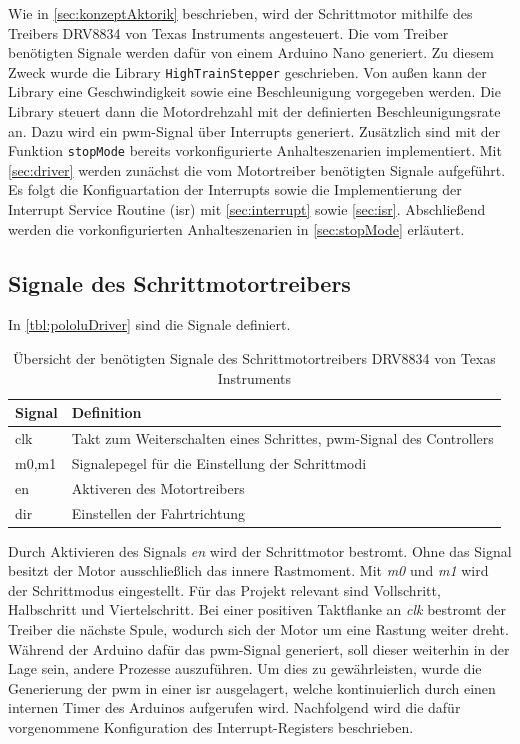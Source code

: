 Wie in \autoref{sec:konzeptAktorik} beschrieben, wird der Schrittmotor mithilfe des Treibers DRV8834 von Texas Instruments angesteuert. Die vom Treiber benötigten Signale werden dafür von einem Arduino Nano generiert. Zu diesem Zweck wurde die Library \texttt{HighTrainStepper} geschrieben. Von außen kann der Library  eine Geschwindigkeit sowie eine Beschleunigung vorgegeben werden. Die Library steuert dann die Motordrehzahl mit der definierten Beschleunigungsrate an. Dazu wird ein \acrshort{pwm}-Signal über Interrupts generiert. Zusätzlich sind mit der Funktion \texttt{stopMode} bereits vorkonfigurierte Anhalteszenarien implementiert. Mit \autoref{sec:driver} werden zunächst die vom Motortreiber benötigten Signale aufgeführt. Es folgt die Konfiguartation der Interrupts sowie die Implementierung der Interrupt Service Routine (\acrshort{isr}) mit \autoref{sec:interrupt} sowie \autoref{sec:isr}. Abschließend  werden die vorkonfigurierten Anhalteszenarien in \autoref{sec:stopMode} erläutert.


\subsection{Signale des Schrittmotortreibers}
\label{sec:driver}

In \autoref{tbl:pololuDriver} sind die Signale definiert. 

\begin{table}[h]
	\begin{center}
		\begin{tabular}[h]{l|l}
			\textbf{Signal} & \textbf{Definition} \\
			\hline
			clk & Takt zum Weiterschalten eines Schrittes, \acrshort{pwm}-Signal des Controllers\\
			\hline
			m0,m1 & Signalepegel für die Einstellung der Schrittmodi\\
			\hline
			en & Aktiveren des Motortreibers\\
			\hline
			dir & Einstellen der Fahrtrichtung\\
		\end{tabular}
	\end{center}
	\caption{Übersicht der benötigten Signale des Schrittmotortreibers DRV8834 von Texas Instruments}
	\label{tbl:pololuDriver}
\end{table}

Durch Aktivieren des Signals \textit{en} wird der Schrittmotor bestromt. Ohne das Signal besitzt der Motor ausschließlich das innere Rastmoment. Mit \textit{m0} und \textit{m1} wird der Schrittmodus eingestellt. Für das Projekt relevant sind Vollschritt, Halbschritt und Viertelschritt. Bei einer positiven Taktflanke an \textit{clk} bestromt der Treiber die nächste Spule, wodurch sich der Motor um eine Rastung weiter dreht. Während der Arduino dafür das  \acrshort{pwm}-Signal generiert, soll dieser weiterhin in der Lage sein, andere Prozesse auszuführen. Um dies zu gewährleisten, wurde die Generierung der  \acrshort{pwm} in einer \acrshort{isr} ausgelagert, welche kontinuierlich durch einen internen Timer des Arduinos aufgerufen wird. Nachfolgend wird die dafür vorgenommene Konfiguration des Interrupt-Registers beschrieben.\\

